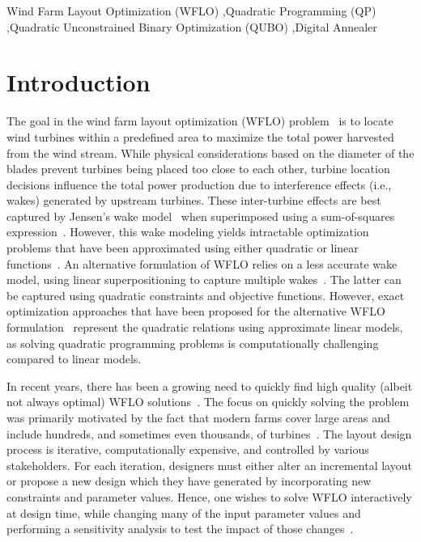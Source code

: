 \documentclass[preprint,12pt]{elsarticle}
\begin{document}
\begin{keyword}
	Wind Farm Layout Optimization (WFLO) \sep Quadratic Programming (QP) \sep Quadratic Unconstrained Binary Optimization (QUBO) \sep Digital Annealer
\end{keyword}

\maketitle 

\section{Introduction}

The goal in the wind farm layout optimization (WFLO)
problem~\cite{MOSETTI1994105} is to locate wind turbines within a
predefined area to maximize the total power harvested from the wind
stream.  While physical considerations based on the diameter of the
blades prevent turbines being placed too close to each other, turbine
location decisions influence the total power production due to
interference effects (i.e., wakes) generated by upstream turbines.
These inter-turbine effects are best captured by Jensen's wake model~\cite{jensen1983note} when superimposed
using a sum-of-squares expression~\cite{Zhang2014}. However,
this wake modeling yields intractable optimization problems
that have been approximated using either quadratic or linear functions~\cite{turner2014new}.
An alternative formulation of WFLO relies on a less accurate wake model, using linear superpositioning
to capture multiple wakes~\cite{donovan2005wind}.
The latter can be captured using quadratic
constraints and objective functions. However, exact optimization
approaches that have been proposed for the alternative WFLO formulation~\cite{Zhang2014,kuo2016wind,donovan2005wind,fagerfjall2010optimizing,archer2011wind,sorkhabi2018constrained}
represent the quadratic relations using approximate linear models,
as solving quadratic programming problems
is computationally challenging compared to linear models.

In recent years, there has been a growing need to quickly find high quality (albeit not always optimal) WFLO solutions~\cite{wilson2014continuous}.
The focus on quickly solving the problem was primarily motivated by the fact
that modern farms cover large areas and include hundreds, and
sometimes even thousands, of turbines~\cite{wilson2013learning}. The layout design
process is iterative, computationally expensive, and controlled
by various stakeholders. For each iteration, designers must either
alter an incremental layout or propose a new design
which they have generated by incorporating new constraints and parameter values.
Hence,
one wishes
to solve WFLO interactively at design time, while changing 
many of the input parameter values
and performing a sensitivity analysis to test the impact of those changes~\cite{wilson2018evolutionary}.
\end{document}
